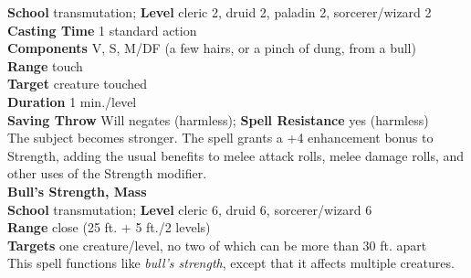 \textbf{School} transmutation; \textbf{Level} cleric 2, druid 2, paladin 2, sorcerer/wizard 2\\
\textbf{Casting Time} 1 standard action\\
\textbf{Components} V, S, M/DF (a few hairs, or a pinch of dung, from a bull)\\
\textbf{Range} touch\\
\textbf{Target} creature touched\\
\textbf{Duration} 1 min./level\\
\textbf{Saving Throw }Will negates (harmless); \textbf{Spell Resistance} yes (harmless)\\
The subject becomes stronger. The spell grants a +4 enhancement bonus to Strength, adding the usual benefits to melee attack rolls, melee damage rolls, and other uses of the Strength modifier.\\
\textbf{Bull's Strength, Mass}\\
\textbf{School} transmutation; \textbf{Level} cleric 6, druid 6, sorcerer/wizard 6\\
\textbf{Range} close (25 ft. + 5 ft./2 levels)\\
\textbf{Targets} one creature/level, no two of which can be more than 30 ft. apart\\
This spell functions like \textit{bull's strength}, except that it affects multiple creatures.\\
